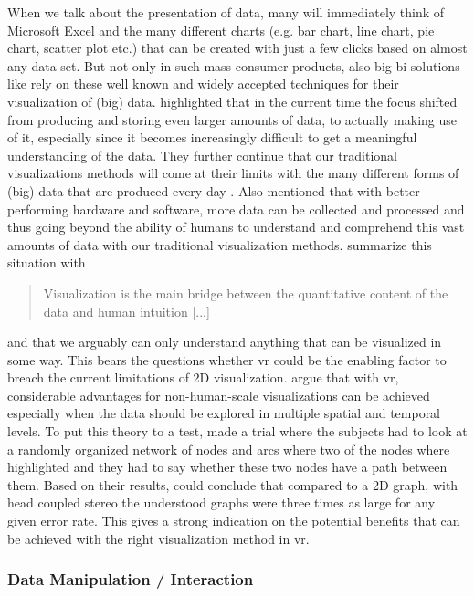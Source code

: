 When we talk about the presentation of data, many will immediately think of Microsoft Excel and the many different charts (e.g. bar chart, line chart, pie chart, scatter plot etc.) that can be created with just a few clicks based on almost any data set. But not only in such mass consumer products, also big \gls{bi} solutions like \cite{TableauSoftware2016} rely on these well known and widely accepted techniques for their visualization of (big) data. \newline
\cite{Jamieson2007} highlighted that in the current time the focus shifted from producing and storing even larger amounts of data, to actually making use of it, especially since it becomes increasingly difficult to get a meaningful understanding of the data. They further continue that our traditional visualizations methods will come at their limits with the many different forms of (big) data that are produced every day \citep{Jamieson2007}. Also \cite{Sarathy2000} mentioned that with better performing hardware and software, more data can be collected and processed and thus going beyond the ability of humans to understand and comprehend this vast amounts of data with our traditional visualization methods. \cite[p.609]{Donalek2014} summarize this situation with \blockquote{Visualization is the main bridge between the quantitative content of the data and human intuition [...]} and that we arguably can only understand anything that can be visualized in some way. This bears the questions whether \gls{vr} could be the enabling factor to breach the current limitations of 2D visualization.\newline
\cite{VanDam2002} argue that with \gls{vr}, considerable advantages for non-human-scale visualizations can be achieved especially when the data should be explored in multiple spatial and temporal levels. To put this theory to a test, \cite{Ware1994} made a trial where the subjects had to look at a randomly organized network of nodes and arcs where two of the nodes where highlighted and they had to say whether these two nodes have a path between them. Based on their results, \cite{Ware1994} could conclude that compared to a 2D graph, with head coupled stereo the understood graphs were three times as large for any given error rate. This gives a strong indication on the potential benefits that can be achieved with the right visualization method in \gls{vr}.



\subsubsection{Data Manipulation / Interaction}

